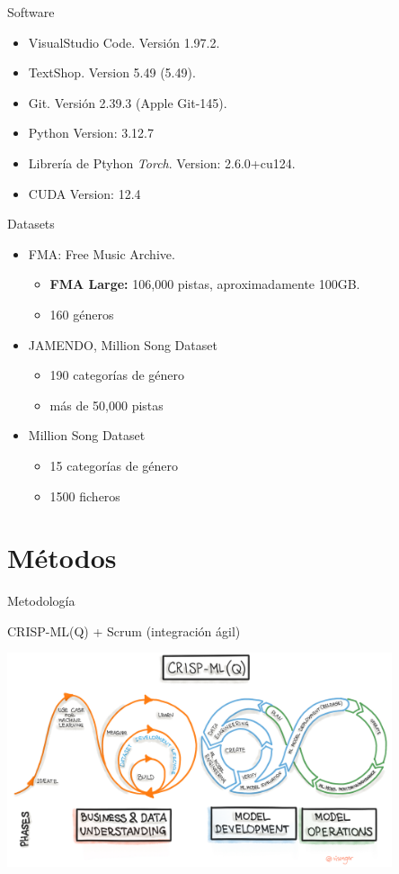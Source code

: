 \documentclass{beamer}
\newcommand{\currentsectionindex}{0}
\begin{document}
\begin{frame}{Software}
  \begin{itemize}
    \item VisualStudio Code. Versión 1.97.2.
    \item TextShop. Version 5.49 (5.49).
    \item Git. Versión 2.39.3 (Apple Git-145).
    \item Python Version: 3.12.7
    \item Librería de Ptyhon \emph{Torch}. Version: 2.6.0+cu124.
    \item CUDA Version: 12.4
  \end{itemize}
\end{frame}

\begin{frame}{Datasets}
\begin{itemize}
  \item FMA: Free Music Archive.
  \begin{itemize}
    \item \textbf{FMA Large:} 106,000 pistas, aproximadamente 100GB.
    \item 160 géneros
  \end{itemize}
  \item JAMENDO, Million Song Dataset
  \begin{itemize}
    \item 190 categorías de género
    \item más de 50,000 pistas
  \end{itemize}
  \item Million Song Dataset
  \begin{itemize}
    \item 15 categorías de género
    \item 1500 ficheros
  \end{itemize}
\end{itemize}
\end{frame}

\renewcommand{\currentsectionindex}{4}
\section{Métodos}
\begin{frame}{Metodología}
\begin{center}
  CRISP-ML(Q) + Scrum (integración ágil)
\end{center}
\begin{center}
  \includegraphics[width=0.85\textwidth]{images/crisp-ml-process.jpg}
\end{center}
\end{frame}
\end{document}
